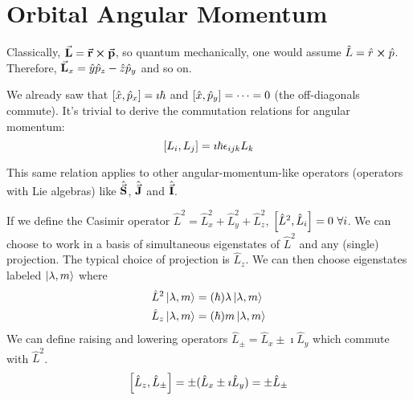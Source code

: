\documentclass[a4paper,twoside,master.tex]{subfiles}
\begin{document}

\section{Orbital Angular Momentum}
\label{sec:orbital_angular_momentum}

Classically, $ \va{L} = \va{r} \cross \va{p} $, so quantum mechanically, one would assume $ \hat{L} = \hat{r} \cross \hat{p} $. Therefore, $ \va{L}_x = \hat{y} \hat{p}_z - \hat{z} \hat{p}_y $ and so on.

We already saw that $ \comm{\hat{x}}{\hat{p}_x} = \imath \hbar $ and $ \comm{\hat{x}}{\hat{p}_y} = \cdots = 0 $ (the off-diagonals commute). It's trivial to derive the commutation relations for angular momentum:
\begin{equation}
    \comm{L_i}{L_j} = \imath \hbar \epsilon_{ijk} L_k
\end{equation}

This same relation applies to other angular-momentum-like operators (operators with Lie algebras) like $ \hat{\va{S}} $, $ \hat{\va{J}} $ and $ \hat{\va{I}} $.

If we define the Casimir operator $ \hat{L}^2 = \hat{L}_x^2 + \hat{L}_y^2 + \hat{L}_z^2 $, $ \comm{\hat{L}^2}{\hat{L}_i} = 0\ \forall i $. We can choose to work in a basis of simultaneous eigenstates of $ \hat{L}^2 $ and any (single) projection. The typical choice of projection is $ \hat{L}_z $. We can then choose eigenstates labeled $\ket{\lambda,m} $ where
\begin{align}
    \hat{L}^2\ket{\lambda, m} &= (\hbar)\lambda\ket{\lambda, m} \\
    \hat{L}_z\ket{\lambda, m} &= (\hbar)m\ket{\lambda, m}
\end{align}
We can define raising and lowering operators $ \hat{L}_{\pm} = \hat{L}_x \pm \imath \hat{L}_y $ which commute with $ \hat{L}^2 $.
\begin{equation}
    \comm{\hat{L}_z}{\hat{L}_{\pm}} = \pm (\hat{L}_x \pm \imath \hat{L}_y) = \pm \hat{L}_{\pm}
\end{equation}
\end{document}
